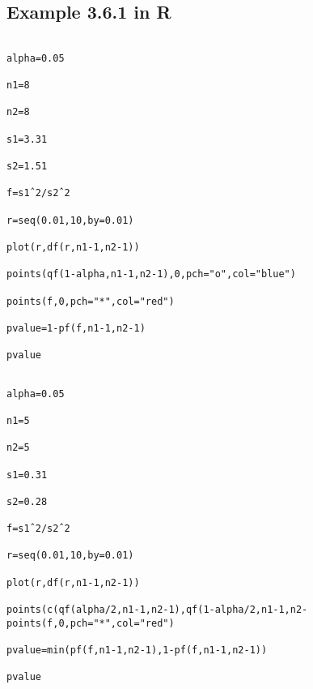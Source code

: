  



 





 





\subsection{Example 3.6.1 in R}

\begin{verbatim}

alpha=0.05

n1=8

n2=8

s1=3.31

s2=1.51

f=s1ˆ2/s2ˆ2

r=seq(0.01,10,by=0.01)

plot(r,df(r,n1-1,n2-1))

points(qf(1-alpha,n1-1,n2-1),0,pch="o",col="blue")

points(f,0,pch="*",col="red")

pvalue=1-pf(f,n1-1,n2-1)

pvalue

\end{verbatim}

 





 





 







\begin{verbatim}

alpha=0.05

n1=5

n2=5

s1=0.31

s2=0.28

f=s1ˆ2/s2ˆ2

r=seq(0.01,10,by=0.01)

plot(r,df(r,n1-1,n2-1))

points(c(qf(alpha/2,n1-1,n2-1),qf(1-alpha/2,n1-1,n2-points(f,0,pch="*",col="red")

pvalue=min(pf(f,n1-1,n2-1),1-pf(f,n1-1,n2-1))

pvalue

\end{verbatim}


